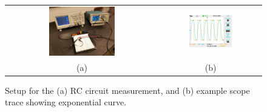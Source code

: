 \begin{figure}[htbp]
\begin{center}
\begin{tabular}{cc}
\includegraphics[width=0.45\textwidth]{figs/labs/transients/rc_setup.jpg} &
\includegraphics[width=0.45\textwidth]{figs/labs/transients/rc_trace.jpg} \\
(a) & (b) \\
\end{tabular}
\caption{Setup for the (a) RC circuit measurement, and (b) example scope trace showing exponential curve.}
\label{fig:rc_setup}
\end{center}
\end{figure}

